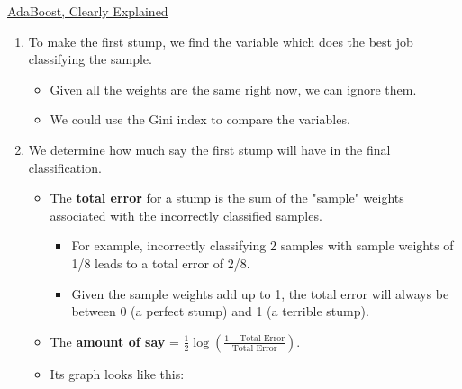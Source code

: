 \documentclass[12pt, titlepage, french]{report}
\begin{document}
\begin{YTB_SUMM_AUTO_NUMB}[label = {SQ-Boo-Ada}]{\href{https://www.youtube.com/watch?v=LsK-xG1cLYA&feature=youtu.be}{AdaBoost, Clearly Explained}}
\begin{enumerate}[leftmargin = *]
\item	To make the first stump, we find the variable which does the best job classifying the sample.
\begin{itemize}
	\item	Given all the weights are the same right now, we can ignore them.
	\item	We could use the Gini index to compare the variables.
\end{itemize}

\item	We determine how much say the first stump will have in the final classification.
\begin{itemize}
	\item	The \textbf{total error} for a stump is the sum of the "sample" weights associated with the incorrectly classified samples.
		\begin{itemize}[leftmargin = *]
		\item	For example, incorrectly classifying 2 samples with sample weights of 1/8 leads to a total error of 2/8.
		\item	Given the sample weights add up to 1, the total error will always be between 0 (a perfect stump) and 1 (a terrible stump).
		\end{itemize}
	\item	The \textbf{amount of say} = $\frac{1}{2} \log \left( \frac{1 - \text{Total Error}}{\text{Total Error}} \right)$.
	\item[]	Its graph looks like this:
	\begin{center}

\end{center}
\end{itemize}
\end{enumerate}
\end{YTB_SUMM_AUTO_NUMB}
\end{document}
